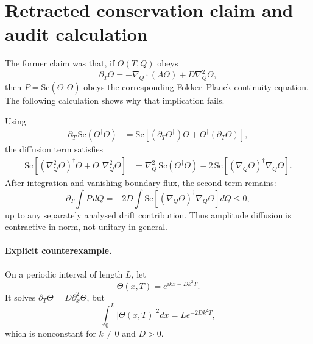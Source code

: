 \documentclass[12pt,a4paper]{article}
\theoremstyle{definition}
\theoremstyle{remark}
\begin{document}
\section{Retracted conservation claim and audit calculation}
\label{sec:born}

The former claim was that, if $\Theta(T,Q)$ obeys
\begin{equation}
  \partial_T\Theta=-\nabla_Q\!\cdot(A\Theta)+D\nabla_Q^2\Theta,
  \label{eq:FPE-amplitude}
\end{equation}
then $P=\mathrm{Sc}(\Theta^\dagger\Theta)$ obeys the corresponding
Fokker--Planck continuity equation.  The following calculation shows why that
implication fails.

Using
\begin{align}
  \partial_T\,\mathrm{Sc}(\Theta^\dagger\Theta)
  &=\mathrm{Sc}\!\left[(\partial_T\Theta^\dagger)\Theta
       +\Theta^\dagger(\partial_T\Theta)\right],
\end{align}
the diffusion term satisfies
\begin{align}
  \mathrm{Sc}\!\left[(\nabla_Q^2\Theta)^\dagger\Theta
       +\Theta^\dagger\nabla_Q^2\Theta\right]
  &=\nabla_Q^2\,\mathrm{Sc}(\Theta^\dagger\Theta)
    -2\,\mathrm{Sc}\!\left[(\nabla_Q\Theta)^\dagger\nabla_Q\Theta\right].
\end{align}
After integration and vanishing boundary flux, the second term remains:
\begin{equation}
  \partial_T\int P\,dQ
  =-2D\int\mathrm{Sc}\!\left[(\nabla_Q\Theta)^\dagger
      \nabla_Q\Theta\right]dQ\leq0,
  \label{eq:norm-decay}
\end{equation}
up to any separately analysed drift contribution.  Thus amplitude diffusion is
contractive in norm, not unitary in general.

\paragraph{Explicit counterexample.}
On a periodic interval of length $L$, let
\begin{equation}
  \Theta(x,T)=e^{ikx-Dk^2T}.
\end{equation}
It solves $\partial_T\Theta=D\partial_x^2\Theta$, but
\begin{equation}
  \int_0^L|\Theta(x,T)|^2dx=L e^{-2Dk^2T},
\end{equation}
which is nonconstant for $k\neq0$ and $D>0$.
\end{document}
